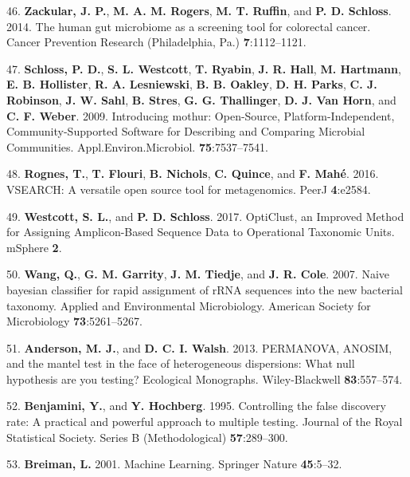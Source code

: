 \documentclass[12pt,]{article}
\begin{document}
\hypertarget{ref-zackular_human_2014}{}
46. \textbf{Zackular, J. P.}, \textbf{M. A. M. Rogers}, \textbf{M. T.
Ruffin}, and \textbf{P. D. Schloss}. 2014. The human gut microbiome as a
screening tool for colorectal cancer. Cancer Prevention Research
(Philadelphia, Pa.) \textbf{7}:1112--1121.

\hypertarget{ref-schloss_introducing_2009}{}
47. \textbf{Schloss, P. D.}, \textbf{S. L. Westcott}, \textbf{T.
Ryabin}, \textbf{J. R. Hall}, \textbf{M. Hartmann}, \textbf{E. B.
Hollister}, \textbf{R. A. Lesniewski}, \textbf{B. B. Oakley}, \textbf{D.
H. Parks}, \textbf{C. J. Robinson}, \textbf{J. W. Sahl}, \textbf{B.
Stres}, \textbf{G. G. Thallinger}, \textbf{D. J. Van Horn}, and
\textbf{C. F. Weber}. 2009. Introducing mothur: Open-Source,
Platform-Independent, Community-Supported Software for Describing and
Comparing Microbial Communities. Appl.Environ.Microbiol.
\textbf{75}:7537--7541.

\hypertarget{ref-rognes_vsearch_2016}{}
48. \textbf{Rognes, T.}, \textbf{T. Flouri}, \textbf{B. Nichols},
\textbf{C. Quince}, and \textbf{F. Mahé}. 2016. VSEARCH: A versatile
open source tool for metagenomics. PeerJ \textbf{4}:e2584.

\hypertarget{ref-westcott_opticlust_2017}{}
49. \textbf{Westcott, S. L.}, and \textbf{P. D. Schloss}. 2017.
OptiClust, an Improved Method for Assigning Amplicon-Based Sequence Data
to Operational Taxonomic Units. mSphere \textbf{2}.

\hypertarget{ref-rdp_Wang2007}{}
50. \textbf{Wang, Q.}, \textbf{G. M. Garrity}, \textbf{J. M. Tiedje},
and \textbf{J. R. Cole}. 2007. Naive bayesian classifier for rapid
assignment of rRNA sequences into the new bacterial taxonomy. Applied
and Environmental Microbiology. American Society for Microbiology
\textbf{73}:5261--5267.

\hypertarget{ref-permanova_Anderson2013}{}
51. \textbf{Anderson, M. J.}, and \textbf{D. C. I. Walsh}. 2013.
PERMANOVA, ANOSIM, and the mantel test in the face of heterogeneous
dispersions: What null hypothesis are you testing? Ecological
Monographs. Wiley-Blackwell \textbf{83}:557--574.

\hypertarget{ref-benjamini_controlling_1995}{}
52. \textbf{Benjamini, Y.}, and \textbf{Y. Hochberg}. 1995. Controlling
the false discovery rate: A practical and powerful approach to multiple
testing. Journal of the Royal Statistical Society. Series B
(Methodological) \textbf{57}:289--300.

\hypertarget{ref-Breiman2001}{}
53. \textbf{Breiman, L.} 2001. Machine Learning. Springer Nature
\textbf{45}:5--32.
\end{document}
